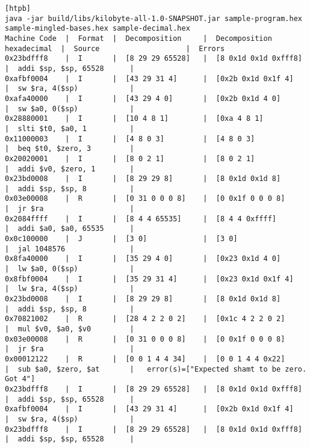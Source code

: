 \begin{landscape}
\begin{lstlisting}[style=plain,
    basicstyle=\footnotesize,
    caption=Tabularized output,
    label=listing:tabularized-output,
][htpb]
java -jar build/libs/kilobyte-all-1.0-SNAPSHOT.jar sample-program.hex sample-mingled-bases.hex sample-decimal.hex
Machine Code  |  Format  |  Decomposition     |  Decomposition hexadecimal  |  Source                    |  Errors
0x23bdfff8    |  I       |  [8 29 29 65528]   |  [8 0x1d 0x1d 0xfff8]       |  addi $sp, $sp, 65528      |  
0xafbf0004    |  I       |  [43 29 31 4]      |  [0x2b 0x1d 0x1f 4]         |  sw $ra, 4($sp)            |  
0xafa40000    |  I       |  [43 29 4 0]       |  [0x2b 0x1d 4 0]            |  sw $a0, 0($sp)            |  
0x28880001    |  I       |  [10 4 8 1]        |  [0xa 4 8 1]                |  slti $t0, $a0, 1          |  
0x11000003    |  I       |  [4 8 0 3]         |  [4 8 0 3]                  |  beq $t0, $zero, 3         |  
0x20020001    |  I       |  [8 0 2 1]         |  [8 0 2 1]                  |  addi $v0, $zero, 1        |  
0x23bd0008    |  I       |  [8 29 29 8]       |  [8 0x1d 0x1d 8]            |  addi $sp, $sp, 8          |  
0x03e00008    |  R       |  [0 31 0 0 0 8]    |  [0 0x1f 0 0 0 8]           |  jr $ra                    |  
0x2084ffff    |  I       |  [8 4 4 65535]     |  [8 4 4 0xffff]             |  addi $a0, $a0, 65535      |  
0x0c100000    |  J       |  [3 0]             |  [3 0]                      |  jal 1048576               |  
0x8fa40000    |  I       |  [35 29 4 0]       |  [0x23 0x1d 4 0]            |  lw $a0, 0($sp)            |  
0x8fbf0004    |  I       |  [35 29 31 4]      |  [0x23 0x1d 0x1f 4]         |  lw $ra, 4($sp)            |  
0x23bd0008    |  I       |  [8 29 29 8]       |  [8 0x1d 0x1d 8]            |  addi $sp, $sp, 8          |  
0x70821002    |  R       |  [28 4 2 2 0 2]    |  [0x1c 4 2 2 0 2]           |  mul $v0, $a0, $v0         |  
0x03e00008    |  R       |  [0 31 0 0 0 8]    |  [0 0x1f 0 0 0 8]           |  jr $ra                    |  
0x00012122    |  R       |  [0 0 1 4 4 34]    |  [0 0 1 4 4 0x22]           |  sub $a0, $zero, $at       |   error(s)=["Expected shamt to be zero. Got 4"]
0x23bdfff8    |  I       |  [8 29 29 65528]   |  [8 0x1d 0x1d 0xfff8]       |  addi $sp, $sp, 65528      |  
0xafbf0004    |  I       |  [43 29 31 4]      |  [0x2b 0x1d 0x1f 4]         |  sw $ra, 4($sp)            |  
0x23bdfff8    |  I       |  [8 29 29 65528]   |  [8 0x1d 0x1d 0xfff8]       |  addi $sp, $sp, 65528      | 
\end{lstlisting}


\end{landscape}
